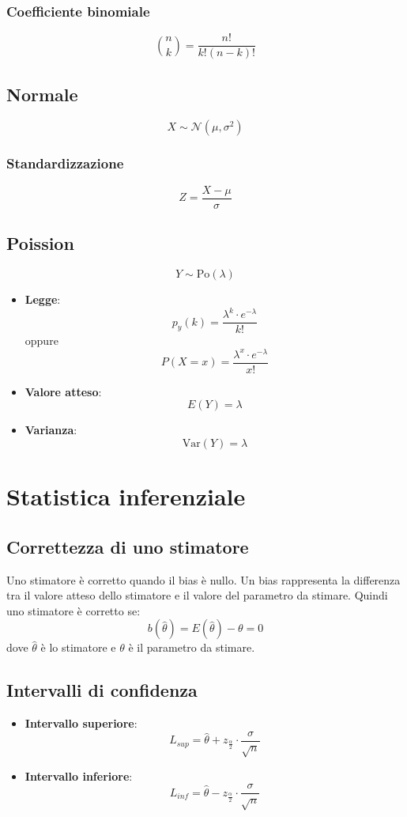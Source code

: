 \documentclass[a4paper]{article}
\theoremstyle{break}
\theoremstyle{break}
\theoremstyle{break}
\theoremstyle{break}
\begin{document}
\subsubsection{Coefficiente binomiale}
\[
  \binom{n}{k} = \frac{n!}{k!(n-k)!}
\] 

\subsection{Normale}
\[
  X \sim \mathcal{N}(\mu, \sigma^{2})
\]
\subsubsection{Standardizzazione}
\[
  Z = \frac{X - \mu}{\sigma}
\]

\subsection{Poission}
\[
  Y \sim \text{Po}(\lambda)
\] 
\begin{itemize}
  \item \textbf{Legge}:
    \[
      p_y(k) = \frac{\lambda^{k} \cdot e^{-\lambda}}{k!}
    \] 
    oppure
    \[
      P(X = x) = \frac{\lambda^{x} \cdot e^{-\lambda}}{x!}
    \] 
  \item \textbf{Valore atteso}:
    \[
      E(Y) = \lambda
    \]
  \item \textbf{Varianza}:
    \[
      \text{Var}(Y) = \lambda
    \]
\end{itemize}

\section{Statistica inferenziale}
\subsection{Correttezza di uno stimatore}
Uno stimatore è corretto quando il bias è nullo. Un bias rappresenta la differenza tra il valore atteso dello stimatore e il valore del parametro da stimare. Quindi uno stimatore è corretto se:
\[
  b(\hat{\theta}) = E(\hat{\theta}) - \theta = 0
\]
dove $\hat{\theta}$ è lo stimatore e $\theta$ è il parametro da stimare.

\subsection{Intervalli di confidenza}
\begin{itemize}
  \item \textbf{Intervallo superiore}:
    \[
      L_{sup} = \hat{\theta} + z_{\frac{\alpha}{2}} \cdot \frac{\sigma}{\sqrt{n}}
    \]
  \item \textbf{Intervallo inferiore}:
    \[
      L_{inf} = \hat{\theta} - z_{\frac{\alpha}{2}} \cdot \frac{\sigma}{\sqrt{n}}
    \]
\end{itemize}
\end{document}
